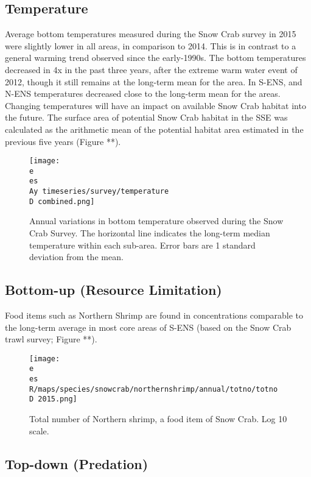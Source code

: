 \documentclass[paper=a4, fontsize=11pt]{article}
\newcommand{\D}{.}
\newcommand{\e}{/home/michelle/ecomod_data/}
\newcommand{\es}{snowcrab/}
\newcommand{\Ay}{assessments/2015/}
\begin{document}
\subsection{Temperature}

Average bottom temperatures measured during the Snow Crab survey in 2015 were slightly lower in all areas, in comparison to 2014. This is in contrast to a general warming trend observed since the early-1990s. The bottom temperatures decreased in 4x in the past three years, after the extreme warm water event of 2012, though it still remains at the long-term mean for the area. In S-ENS, and N-ENS temperatures decreased close to the long-term mean for the areas. Changing temperatures will have an impact on available Snow Crab habitat into the future. The surface area of potential Snow Crab habitat in the SSE was calculated as the arithmetic mean of the potential habitat area estimated in the previous five years (Figure **). 

\begin{figure}[h]
    \centering
    \texttt{[image: \\e \\es \\Ay timeseries/survey/temperature\\D combined.png]}
    \caption{Annual variations in bottom temperature observed during the Snow Crab Survey. The horizontal line indicates the long-term median temperature within each sub-area. Error bars are 1 standard deviation from the mean.}
\end{figure}


\subsection{Bottom-up (Resource Limitation)}

Food items such as Northern Shrimp are found in concentrations comparable to the long-term average in most core areas of S-ENS (based on the Snow Crab trawl survey; Figure **).

\begin{figure}[h]
  \centering
     \texttt{[image: \\e \\es R/maps/species/snowcrab/northernshrimp/annual/totno/totno\\D 2015.png]}
    \caption{Total number of Northern shrimp, a food item of Snow Crab. Log 10 scale.}
\end{figure}

\subsection{Top-down (Predation)}
\end{document}
